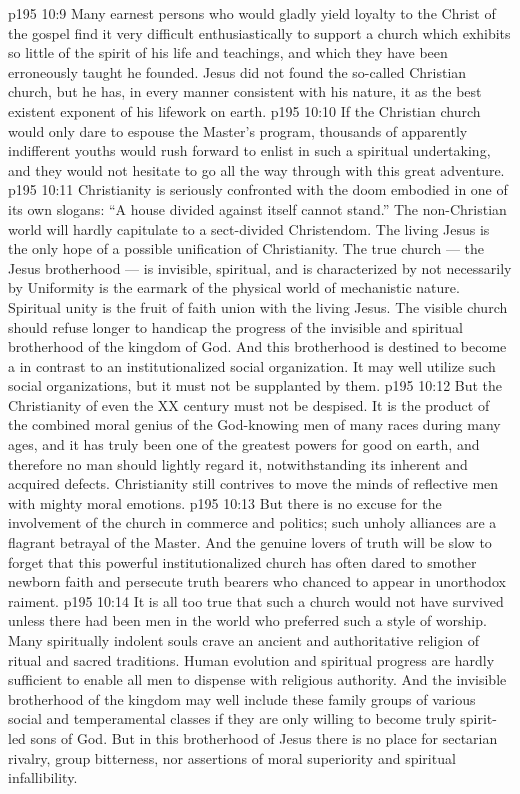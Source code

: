 \vs p195 10:9 Many earnest persons who would gladly yield loyalty to the Christ of the gospel find it very difficult enthusiastically to support a church which exhibits so little of the spirit of his life and teachings, and which they have been erroneously taught he founded. Jesus did not found the so\hyp{}called Christian church, but he has, in every manner consistent with his nature,  it as the best existent exponent of his lifework on earth.
\vs p195 10:10 If the Christian church would only dare to espouse the Master’s program, thousands of apparently indifferent youths would rush forward to enlist in such a spiritual undertaking, and they would not hesitate to go all the way through with this great adventure.
\vs p195 10:11 Christianity is seriously confronted with the doom embodied in one of its own slogans: “A house divided against itself cannot stand.” The non\hyp{}Christian world will hardly capitulate to a sect\hyp{}divided Christendom. The living Jesus is the only hope of a possible unification of Christianity. The true church --- the Jesus brotherhood --- is invisible, spiritual, and is characterized by  not necessarily by  Uniformity is the earmark of the physical world of mechanistic nature. Spiritual unity is the fruit of faith union with the living Jesus. The visible church should refuse longer to handicap the progress of the invisible and spiritual brotherhood of the kingdom of God. And this brotherhood is destined to become a  in contrast to an institutionalized social organization. It may well utilize such social organizations, but it must not be supplanted by them.
\vs p195 10:12 But the Christianity of even the XX century must not be despised. It is the product of the combined moral genius of the God\hyp{}knowing men of many races during many ages, and it has truly been one of the greatest powers for good on earth, and therefore no man should lightly regard it, notwithstanding its inherent and acquired defects. Christianity still contrives to move the minds of reflective men with mighty moral emotions.
\vs p195 10:13 But there is no excuse for the involvement of the church in commerce and politics; such unholy alliances are a flagrant betrayal of the Master. And the genuine lovers of truth will be slow to forget that this powerful institutionalized church has often dared to smother newborn faith and persecute truth bearers who chanced to appear in unorthodox raiment.
\vs p195 10:14 It is all too true that such a church would not have survived unless there had been men in the world who preferred such a style of worship. Many spiritually indolent souls crave an ancient and authoritative religion of ritual and sacred traditions. Human evolution and spiritual progress are hardly sufficient to enable all men to dispense with religious authority. And the invisible brotherhood of the kingdom may well include these family groups of various social and temperamental classes if they are only willing to become truly spirit\hyp{}led sons of God. But in this brotherhood of Jesus there is no place for sectarian rivalry, group bitterness, nor assertions of moral superiority and spiritual infallibility.

